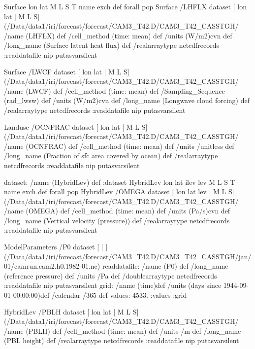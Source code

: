 \begin{ingrid}
Surface { lon lat M L S T } { name exch def } forall pop
Surface /LHFLX{
dataset
[ lon lat | M L S] (/Data/data1/iri/forecast/forecast/CAM3_T42.D/CAM3_T42_CASSTGH/%
/name (LHFLX) def
 /cell_method (time: mean) def
 /units (W/m2)cvn def
 /long_name (Surface latent heat flux) def
 /realarraytype netcdfrecords :readdatafile
nip
}putasvarsilent


Surface /LWCF{
dataset
[ lon lat | M L S] (/Data/data1/iri/forecast/forecast/CAM3_T42.D/CAM3_T42_CASSTGH/%
/name (LWCF) def
 /cell_method (time: mean) def
 /Sampling_Sequence (rad_lwsw) def
 /units (W/m2)cvn def
 /long_name (Longwave cloud forcing) def
 /realarraytype netcdfrecords :readdatafile
nip
}putasvarsilent




Landuse /OCNFRAC{
dataset
[ lon lat | M L S] (/Data/data1/iri/forecast/forecast/CAM3_T42.D/CAM3_T42_CASSTGH/%
/name (OCNFRAC) def
 /cell_method (time: mean) def
 /units /unitless def
 /long_name (Fraction of sfc area covered by ocean) def
 /realarraytype netcdfrecords :readdatafile
nip
}putasvarsilent

dataset: /name (HybridLev) def :dataset
HybridLev { lon lat ilev lev M L S T} {name exch def} forall pop
HybridLev /OMEGA{
dataset
[ lon lat lev | M L S] (/Data/data1/iri/forecast/forecast/CAM3_T42.D/CAM3_T42_CASSTGH/%
/name (OMEGA) def
 /cell_method (time: mean) def
 /units (Pa/s)cvn def
 /long_name (Vertical velocity (pressure)) def
 /realarraytype netcdfrecords :readdatafile
nip
}putasvarsilent

ModelParameters /P0{
dataset
[ | ] (/Data/data1/iri/forecast/forecast/CAM3_T42.D/CAM3_T42_CASSTGH/jan/01/camrun.cam2.h0.1982-01.nc) readdatafile:
/name (P0) def
 /long_name (reference pressure) def
 /units /Pa def
 /doublearraytype netcdfrecords :readdatafile
nip
}putasvarsilent
grid:
/name (time)def
/units (days since 1944-09-01 00:00:00)def
/calendar /365 def
values: 4533. :values
:grid


HybridLev  /PBLH{
dataset
[ lon lat | M L S] (/Data/data1/iri/forecast/forecast/CAM3_T42.D/CAM3_T42_CASSTGH/%
/name (PBLH) def
 /cell_method (time: mean) def
 /units /m def
 /long_name (PBL height) def
 /realarraytype netcdfrecords :readdatafile
nip
}putasvarsilent


\end{ingrid}

